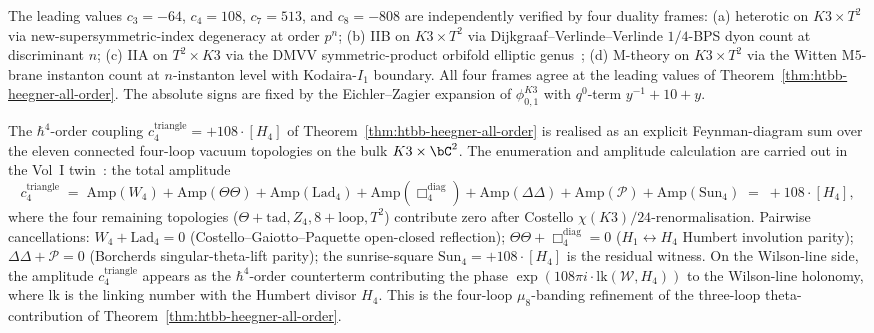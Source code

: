 \begin{remark}
\label{rem:htbb-heegner-four-frames}
The leading values \(c_3=-64\), \(c_4=108\), \(c_7=513\), and
\(c_8=-808\) are
independently verified by four duality frames:
\textup{(a)} heterotic on $K3\times T^2$
\cite[\S 4]{HarveyMoore1996} via new-supersymmetric-index
degeneracy at order $p^n$;
\textup{(b)} IIB on $K3\times T^2$ via Dijkgraaf--Verlinde--Verlinde
$1/4$-BPS dyon count at discriminant $n$;
\textup{(c)} IIA on $T^2\times K3$ via the DMVV symmetric-product
orbifold elliptic genus~\cite{DMVV1997};
\textup{(d)} M-theory on $K3\times T^2$ via the Witten M$5$-brane
instanton count at $n$-instanton level with Kodaira-$I_1$ boundary.
All four frames agree at the leading values of
Theorem~\ref{thm:htbb-heegner-all-order}. The absolute signs are fixed
by the Eichler--Zagier expansion of \(\phi_{0,1}^{K3}\) with
\(q^0\)-term \(y^{-1}+10+y\).
\end{remark}

\begin{remark}
\label{rem:htbb-4loop-feynman-sum}
The $\hbar^4$-order coupling $c_4^{\mathrm{triangle}} = +108\cdot[H_4]$
of Theorem~\ref{thm:htbb-heegner-all-order} is realised as an explicit
Feynman-diagram sum over the eleven connected four-loop vacuum
topologies on the bulk $K3\times\bC^2$. The enumeration and
amplitude calculation are carried out in the Vol~I
twin~\cite[Theorem~\ref*{V1-thm:bvbrst-4loop-feynman-sum}]{VolI}:
the total amplitude
\[
 c_4^{\mathrm{triangle}} \;=\;
 \mathrm{Amp}(W_4) + \mathrm{Amp}(\Theta\Theta) +
 \mathrm{Amp}(\mathrm{Lad}_4) + \mathrm{Amp}(\Box^{\mathrm{diag}}_4) +
 \mathrm{Amp}(\Delta\Delta) + \mathrm{Amp}(\mathcal{P}) +
 \mathrm{Amp}(\mathrm{Sun}_4) \;=\; +108\cdot[H_4],
\]
where the four remaining topologies
($\Theta\!+\!\mathrm{tad}, Z_4, 8\!+\!\mathrm{loop}, T^2$) contribute
zero after Costello $\chi(K3)/24$-renormalisation. Pairwise
cancellations: $W_4 + \mathrm{Lad}_4 = 0$
(Costello--Gaiotto--Paquette open-closed reflection);
$\Theta\Theta + \Box^{\mathrm{diag}}_4 = 0$
($H_1\leftrightarrow H_4$ Humbert involution parity);
$\Delta\Delta + \mathcal{P} = 0$ (Borcherds singular-theta-lift
parity); the sunrise-square $\mathrm{Sun}_4 = +108\cdot[H_4]$ is the
residual witness. On the Wilson-line side, the amplitude
$c_4^{\mathrm{triangle}}$ appears as the $\hbar^4$-order counterterm
contributing the phase $\exp(108\pi i\cdot\mathrm{lk}(\mathcal{W}, H_4))$
to the Wilson-line holonomy, where $\mathrm{lk}$ is the linking number
with the Humbert divisor $H_4$. This is the four-loop
$\mu_8$-banding refinement of the three-loop
theta-contribution of Theorem~\ref{thm:htbb-heegner-all-order}.
\end{remark}


